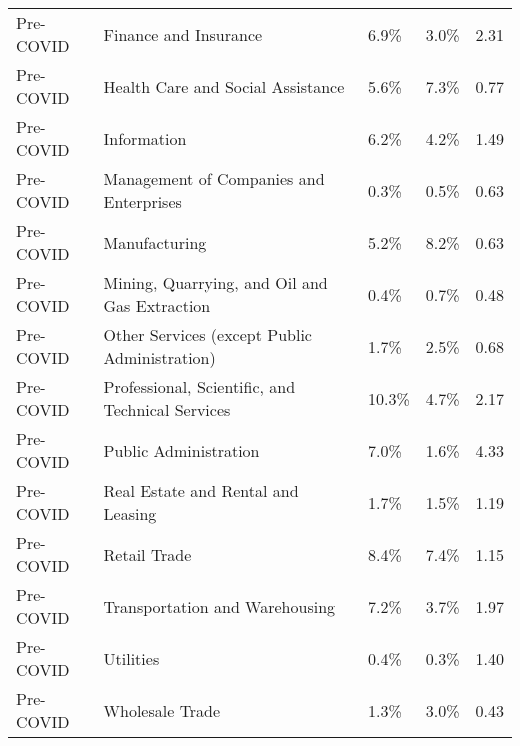 \begin{tabular}{llllr}
  Pre-COVID & Finance and Insurance & 6.9\% & 3.0\% & 2.31 \\ 
  Pre-COVID & Health Care and Social Assistance & 5.6\% & 7.3\% & 0.77 \\ 
  Pre-COVID & Information & 6.2\% & 4.2\% & 1.49 \\ 
  Pre-COVID & Management of Companies and Enterprises & 0.3\% & 0.5\% & 0.63 \\ 
  Pre-COVID & Manufacturing & 5.2\% & 8.2\% & 0.63 \\ 
  Pre-COVID & Mining, Quarrying, and Oil and Gas Extraction & 0.4\% & 0.7\% & 0.48 \\ 
  Pre-COVID & Other Services (except Public Administration) & 1.7\% & 2.5\% & 0.68 \\ 
  Pre-COVID & Professional, Scientific, and Technical Services & 10.3\% & 4.7\% & 2.17 \\ 
  Pre-COVID & Public Administration & 7.0\% & 1.6\% & 4.33 \\ 
  Pre-COVID & Real Estate and Rental and Leasing & 1.7\% & 1.5\% & 1.19 \\ 
  Pre-COVID & Retail Trade & 8.4\% & 7.4\% & 1.15 \\ 
  Pre-COVID & Transportation and Warehousing & 7.2\% & 3.7\% & 1.97 \\ 
  Pre-COVID & Utilities & 0.4\% & 0.3\% & 1.40 \\ 
  Pre-COVID & Wholesale Trade & 1.3\% & 3.0\% & 0.43 \\ 
   \hline
\end{tabular}
